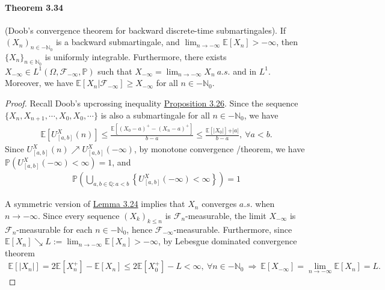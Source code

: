 \documentclass{article}
\numberwithin{equation}{section}
\newcommand{\E}{\mathbb{E}}
\renewcommand{\P}{\mathbb{P}}
\theoremstyle{plain}
\theoremstyle{definition}
\begin{document}
\paragraph{Theorem 3.34\label{thm:3.34}} (Doob's convergence theorem for backward discrete-time submartingales). If $(X_n)_{n\in-\mathbb{N}_0}$ is a backward submartingale, and $\lim_{n\to-\infty}\E[X_n]>-\infty$, then $\{X_n\}_{n\in\mathbb{N}_0}$ is uniformly integrable. Furthermore, there exists $X_{-\infty}\in L^1\left(\Omega,\mathscr{F}_{-\infty},\P\right)$ such that $X_{-\infty}=\lim_{n\to-\infty}X_n\ a.s.$ and in $L^1$. Moreover, we have $\E[X_n|\mathscr{F}_{-\infty}]\geq X_{-\infty}$ for all $n\in-\mathbb{N}_0$.
\begin{proof}
Recall Doob's upcrossing inequality \hyperref[prop:3.26]{Proposition 3.26}. Since the sequence $\{X_n,X_{n+1},\cdots,X_0,X_0,\cdots\}$ is also a submartingale for all $n\in-\mathbb{N}_0$, we have
\begin{align*}
	\E\left[U_{[a,b]}^X(n)\right]\leq\frac{\E[(X_0-a)^+-(X_n-a)^+]}{b-a}\leq \frac{\E[\vert X_0\vert]+\vert a\vert}{b-a},\ \forall a<b.
\end{align*}
Since $U_{[a,b]}^X(n)\nearrow U_{[a,b]}^X(-\infty)$, by monotone convergence /theorem, we have $\P\left(U_{[a,b]}^X(-\infty)<\infty\right)=1$, and
\begin{align*}
	\P\left(\bigcup_{a,b\in\mathbb{Q}:a<b}\left\{U_{[a,b]}^X(-\infty)<\infty\right\}\right)=1
\end{align*}

A symmetric version of \hyperref[lemma:3.24]{Lemma 3.24} implies that $X_n$ converges $a.s.$ when $n\to-\infty$. Since every sequence $(X_k)_{k\leq n}$ is $\mathscr{F}_n$-measurable, the limit $X_{-\infty}$ is $\mathscr{F}_n$-measurable for each $n\in-\mathbb{N}_0$, hence $\mathscr{F}_{-\infty}$-measurable. Furthermore, since $\E[X_n]\searrow L:=\lim_{n\to-\infty}\E[X_n]>-\infty$, by Lebesgue dominated convergence theorem
\begin{align*}
	\E[\vert X_n\vert]=2\E[X_n^+] - \E[X_n] \leq 2\E[X_0^+] - L < \infty,\ \forall n\in-\mathbb{N}_0\ \Rightarrow\ \E[X_{-\infty}]=\lim_{n\to-\infty}\E[X_n]=L.
\end{align*}


\end{proof}
\end{document}
